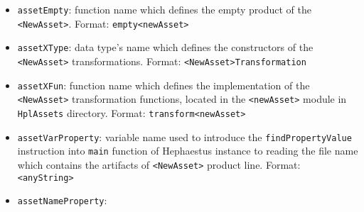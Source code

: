 \begin{itemize}
\item \texttt{assetEmpty}: function name which defines the empty product of the \texttt{<NewAsset>}. Format: \texttt{empty<newAsset>}

\item \texttt{assetXType}: data type's name which defines the constructors of the \texttt{<NewAsset>} transformations. Format: \texttt{<NewAsset>Transformation}

\item \texttt{assetXFun}: function name which defines the implementation of the \texttt{<NewAsset>} transformation functions, located in the \texttt{<newAsset>} module in \texttt{HplAssets} directory. Format: \texttt{transform<newAsset>}

\item \texttt{assetVarProperty}: variable name used to introduce the \texttt{findPropertyValue} instruction into \texttt{main} function of Hephaestus instance to reading the file name which contains the artifacts of \texttt{<NewAsset>} product line. Format: \texttt{<anyString>}

\item \texttt{assetNameProperty}:









\end{itemize}